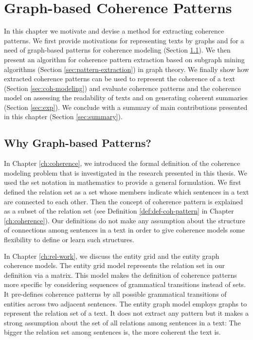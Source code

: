 
\chapter{Graph-based Coherence Patterns}
\label{ch:coh-patterns}

In this chapter we motivate and devise a method for extracting coherence patterns.  
We first provide motivations for representing texts by graphs and for a need of graph-based patterns for coherence modeling (Section \ref{sec:motivation}).  
We then present an algorithm for coherence pattern extraction based on subgraph mining algorithms (Section \ref{sec:pattern-extraction}) in graph theory.  
We finally show how extracted coherence patterns can be used to represent the coherence of a text (Section \ref{sec:coh-modeling}) and evaluate coherence patterns and the coherence model on assessing the readability of texts and on generating coherent summaries (Section \ref{sec:exp}). 
We conclude with a summary of main contributions presented in this chapter (Section \ref{sec:summary}). 

\section{Why Graph-based Patterns?}
\label{sec:motivation}

In Chapter \ref{ch:coherence}, we introduced the formal definition of the coherence modeling problem that is investigated in the research presented in this thesis. 
We used the set notation in mathematics to provide a general formulation. 
We first defined the relation set as a set whose members indicate which sentences in a text are connected to each other. 
Then the concept of coherence pattern is explained as a subset of the relation set (see Definition \ref{def:def-coh-pattern} in Chapter \ref{ch:coherence}). 
Our definitions do not make any assumption about the structure of connections among sentences in a text in order to give coherence models some flexibility to define or learn such structures. 

In Chapter \ref{ch:rel-work}, we discuss the entity grid 
\cite{barzilay05a,barzilay08} and the entity graph 
\cite{guinaudeau13} coherence models. 
The entity grid model represents the relation set in our definition via a matrix. 
This model makes the definition of coherence patterns more specific by considering sequences of grammatical transitions instead of sets.  
It pre-defines coherence patterns by all possible grammatical transitions of entities across two adjacent sentences. 
The entity graph model employs graphs to represent the relation set of a text.  
It does not extract any pattern but it makes a strong assumption about the set of all relations among sentences in a text: The bigger the relation set among sentences is, the more coherent the text is. 

